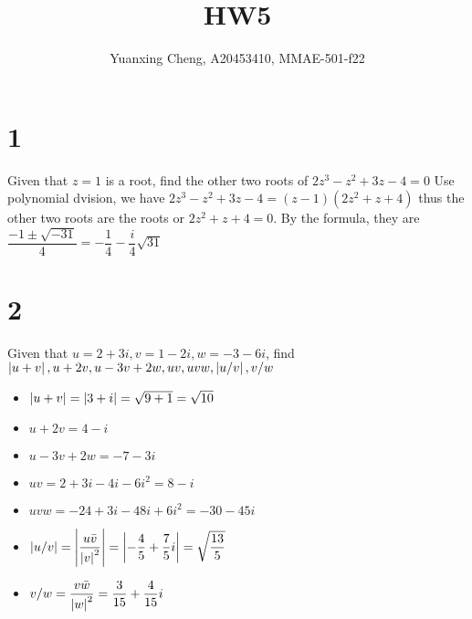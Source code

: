 \documentclass{article}
\title{HW5}
\author{Yuanxing Cheng, A20453410, MMAE-501-f22}
\begin{document}
\maketitle

\section*{1}

\begin{myleftlinebox}
    Given that \(z=1\) is a root, find the other two roots of \(2z^3-z^2+3z-4=0\)
    \tcblower
    Use polynomial dvision, we have \(2z^3-z^2+3z-4=(z-1)(2z^2+z+4)\) thus the other two roots are the roots or \(2z^2+z+4=0\). By the formula, they are \(\dfrac{-1\pm\sqrt{-31}}{4}=-\dfrac{1}{4}-\dfrac{i}{4}\sqrt{31}\)
\end{myleftlinebox}
\section*{2}
\begin{myleftlinebox}
    Given that \(u=2+3i,v=1-2i,w=-3-6i\), find \(\left\vert u+v\right\vert, u+2v,u-3v+2w, uv,uvw,\left\vert u/v\right\vert,v/w\)
    \tcbline
    \begin{itemize}
        \item \(\left\vert u+v\right\vert=\left\vert3+i\right\vert=\sqrt{9+1}=\sqrt{10}\)
        \item \(u+2v=4-i\)
        \item \(u-3v+2w=-7-3i\)
        \item \(uv=2+3i-4i-6i^2=8-i\)
        \item \(uvw=-24+3i-48i+6i^2=-30-45i\)
        \item \(\left\vert u/v\right\vert=\left\vert\dfrac{u\bar v}{\left\vert v\right\vert^2}\right\vert=\left\vert-\dfrac{4}{5}+\dfrac{7}{5}i\right\vert=\sqrt{\dfrac{13}{5}}\)
        \item \(v/w=\dfrac{v\bar w}{\left\vert w\right\vert^2}=\dfrac{3}{15}+\dfrac{4}{15}i\)
    \end{itemize}
\end{myleftlinebox}
\end{document}
